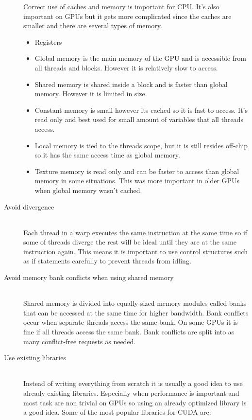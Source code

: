 \documentclass[10pt,a4paper]{article}
\begin{document}
\begin{description}
  Correct use of caches and memory is important for CPU\cite{drepper2007cpumemory}. It's also important on GPUs but it gets more complicated since the caches are smaller and there are several types of memory.
    \begin{itemize}
    \item Registers %
    \item Global memory is the main memory of the GPU and is accessible from all threads and blocks. However it is relatively slow to access.
    \item Shared memory is shared inside a block and is faster than global memory. However it is limited in size.
    \item Constant memory is small however its cached so it is fast to access. It's read only and best used for small amount of variables that all threads access.
    \item Local memory is tied to the threads scope, but it is still resides off-chip so it has the same access time as global memory.
    \item Texture memory is read only and can be faster to access than global memory in some situations. This was more important in older GPUs when global memory wasn't cached.\cite{plink_gpu, cuda}
  \end{itemize}
  \item[Avoid divergence] \hfill \\
  Each thread in a warp executes the same instruction at the same time so if some of threads diverge the rest will be ideal until they are at the same instruction again. This means it is important to use control structures such as if statements carefully to prevent threads from idling.\cite{cuda, cuda_best_practice}
  \item[Avoid memory bank conflicts when using shared memory] \hfill \\
  Shared memory is divided into equally-sized memory modules called banks that can be accessed at the same time for higher bandwidth. Bank conflicts occur when separate threads access the same bank. On some GPUs it is fine if all threads access the same bank. Bank conflicts are split into as many conflict-free requests as needed.\cite{cuda, cuda_best_practice}
  \item[Use existing libraries] \hfill \\
  Instead of writing everything from scratch it is usually a good idea to use already existing libraries. Especially when performance is important and most task are non trivial on GPUs so using an already optimized library is a good idea. Some of the most popular libraries for CUDA are:

\end{description}
\end{document}
